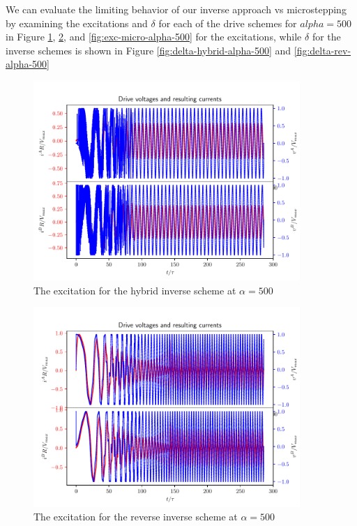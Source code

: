 \documentclass{article}
\begin{document}
We can evaluate the limiting behavior of our inverse approach vs microstepping by examining the excitations and $\delta$ for each of the drive schemes for $alpha=500$ in Figure \ref{fig:exc-hyb-alpha-500}, \ref{fig:exc-rev-alpha-500}, and \ref{fig:exc-micro-alpha-500} for the excitations, while $\delta$ for the inverse schemes is shown in Figure \ref{fig:delta-hybrid-alpha-500} and \ref{fig:delta-rev-alpha-500}
\begin{figure}[h!]
  \centering
  \includegraphics[width=0.9\textwidth]{simfigs/fig3-2018-10-20T14-36-07-hybrid-accel-False-alpha-500.pdf}
  \captionsetup{justification=centering}
  \caption{The excitation for the hybrid inverse scheme at $\alpha=500$}
   \label{fig:exc-hyb-alpha-500}
\end{figure}
\begin{figure}[h!]
  \centering
  \includegraphics[width=0.9\textwidth]{simfigs/fig3-2018-10-20T14-37-59-reverse-alpha-500.pdf}
  \captionsetup{justification=centering}
  \caption{The excitation for the reverse inverse scheme at $\alpha=500$}
   \label{fig:exc-rev-alpha-500}
\end{figure}
\end{document}
